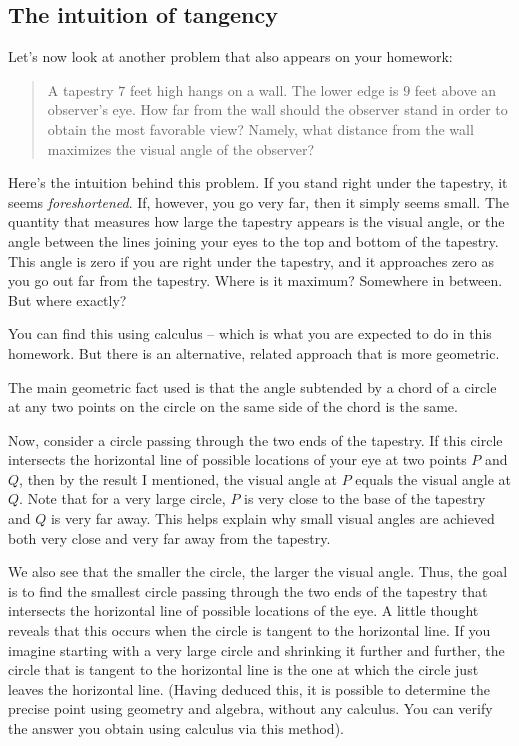 \documentclass[10pt]{amsart}
\begin{document}
\subsection{The intuition of tangency}

Let's now look at another problem that also appears on your homework:

\begin{quote}
  A tapestry $7$ feet high hangs on a wall. The lower edge is $9$ feet
  above an observer's eye. How far from the wall should the observer
  stand in order to obtain the most favorable view? Namely, what
  distance from the wall maximizes the visual angle of the observer?
\end{quote}

Here's the intuition behind this problem. If you stand right under the
tapestry, it seems {\em foreshortened}. If, however, you go very far,
then it simply seems small. The quantity that measures how large the
tapestry appears is the visual angle, or the angle between the lines
joining your eyes to the top and bottom of the tapestry. This angle is
zero if you are right under the tapestry, and it approaches zero as
you go out far from the tapestry. Where is it maximum? Somewhere in
between. But where exactly?

You can find this using calculus -- which is what you are expected to
do in this homework. But there is an alternative, related approach
that is more geometric.

The main geometric fact used is that the angle subtended by a chord of
a circle at any two points on the circle on the same side of the chord
is the same.

Now, consider a circle passing through the two ends of the
tapestry. If this circle intersects the horizontal line of possible
locations of your eye at two points $P$ and $Q$, then by the result I
mentioned, the visual angle at $P$ equals the visual angle at
$Q$. Note that for a very large circle, $P$ is very close to the base
of the tapestry and $Q$ is very far away. This helps explain why small
visual angles are achieved both very close and very far away from the
tapestry.

We also see that the smaller the circle, the larger the visual
angle. Thus, the goal is to find the smallest circle passing through
the two ends of the tapestry that intersects the horizontal line of
possible locations of the eye. A little thought reveals that this
occurs when the circle is tangent to the horizontal line. If you imagine
starting with a very large circle and shrinking it further and
further, the circle that is tangent to the horizontal line is the one
at which the circle just leaves the horizontal line. (Having deduced
this, it is possible to determine the precise point using geometry and
algebra, without any calculus. You can verify the answer you obtain
using calculus via this method).
\end{document}
